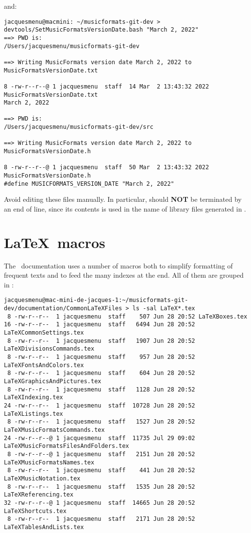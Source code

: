 and:

\begin{lstlisting}[language=Terminal]
jacquesmenu@macmini: ~/musicformats-git-dev > devtools/SetMusicFormatsVersionDate.bash "March 2, 2022"
==> PWD is:
/Users/jacquesmenu/musicformats-git-dev

==> Writing MusicFormats version date March 2, 2022 to MusicFormatsVersionDate.txt

8 -rw-r--r--@ 1 jacquesmenu  staff  14 Mar  2 13:43:32 2022 MusicFormatsVersionDate.txt
March 2, 2022

==> PWD is:
/Users/jacquesmenu/musicformats-git-dev/src

==> Writing MusicFormats version date March 2, 2022 to MusicFormatsVersionDate.h

8 -rw-r--r--@ 1 jacquesmenu  staff  50 Mar  2 13:43:32 2022 MusicFormatsVersionDate.h
#define MUSICFORMATS_VERSION_DATE "March 2, 2022"
\end{lstlisting}

Avoid editing these files manually. In particular,  should {\bf NOT} be terminated by an end of line, since its contents is used in the name of library files generated in .


\section{\LaTeX\ macros}

The \mf\ documentation uses a number of macros both to simplify formatting of frequent texts and to feed the many indexes at the end. All of them are grouped in :
\begin{lstlisting}[language=Terminal]
jacquesmenu@mac-mini-de-jacques-1:~/musicformats-git-dev/documentation/CommonLaTeXFiles > ls -sal LaTeX*.tex
 8 -rw-r--r--  1 jacquesmenu  staff    507 Jun 28 20:52 LaTeXBoxes.tex
16 -rw-r--r--  1 jacquesmenu  staff   6494 Jun 28 20:52 LaTeXCommonSettings.tex
 8 -rw-r--r--  1 jacquesmenu  staff   1907 Jun 28 20:52 LaTeXDivisionsCommands.tex
 8 -rw-r--r--  1 jacquesmenu  staff    957 Jun 28 20:52 LaTeXFontsAndColors.tex
 8 -rw-r--r--  1 jacquesmenu  staff    604 Jun 28 20:52 LaTeXGraphicsAndPictures.tex
 8 -rw-r--r--  1 jacquesmenu  staff   1128 Jun 28 20:52 LaTeXIndexing.tex
24 -rw-r--r--  1 jacquesmenu  staff  10728 Jun 28 20:52 LaTeXListings.tex
 8 -rw-r--r--  1 jacquesmenu  staff   1527 Jun 28 20:52 LaTeXMusicFormatsCommands.tex
24 -rw-r--r--@ 1 jacquesmenu  staff  11735 Jul 29 09:02 LaTeXMusicFormatsFilesAndFolders.tex
 8 -rw-r--r--@ 1 jacquesmenu  staff   2151 Jun 28 20:52 LaTeXMusicFormatsNames.tex
 8 -rw-r--r--  1 jacquesmenu  staff    441 Jun 28 20:52 LaTeXMusicNotation.tex
 8 -rw-r--r--  1 jacquesmenu  staff   1535 Jun 28 20:52 LaTeXReferencing.tex
32 -rw-r--r--@ 1 jacquesmenu  staff  14665 Jun 28 20:52 LaTeXShortcuts.tex
 8 -rw-r--r--  1 jacquesmenu  staff   2171 Jun 28 20:52 LaTeXTablesAndLists.tex
\end{lstlisting}

